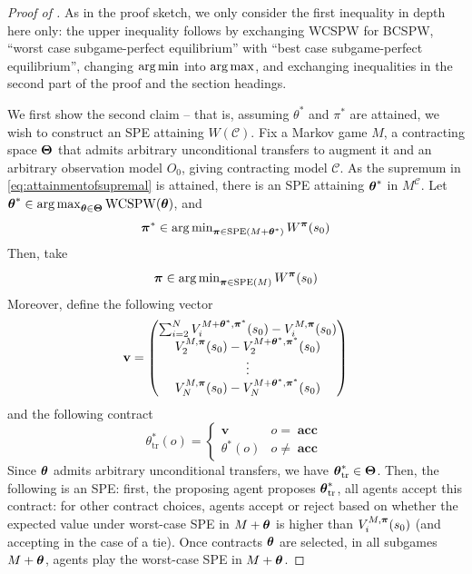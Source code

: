\begin{proof}[Proof of ]
As in the proof sketch, we only consider the first inequality in depth here only: the upper inequality follows by exchanging WCSPW for BCSPW, \enquote{worst case subgame-perfect equilibrium} with \enquote{best case subgame-perfect equilibrium}, changing $\operatorname{arg\,min}$ into $\operatorname{arg\,max}$, and exchanging inequalities in the second part of the proof and the section headings. 

We first show the second claim -- that is, assuming $\theta^*$ and $\pi^*$ are attained, we wish to construct an SPE attaining $W(\mathcal{C})$. Fix a Markov game $M$, a contracting space ${\boldsymbol{\Theta}}$ that admits arbitrary unconditional transfers to augment it and an arbitrary observation model $O_0$, giving contracting model $\mathcal{C}$. As the supremum in \eqref{eq:attainmentofsupremal} is attained, there is an SPE attaining ${\boldsymbol{\theta}}^*$ in $M^{\mathcal C}$. Let ${\boldsymbol{\theta}}^* \in \operatorname{arg\,max}_{{\boldsymbol{\theta}} \in {\boldsymbol{\Theta}}} \operatorname{WCSPW}({\boldsymbol{\theta}})$, and
\[
\boldsymbol{\pi}^* \in \operatorname{arg\,min}_{\boldsymbol{\pi} \in \operatorname{SPE}(M+{\boldsymbol{\theta}}^*)} W^{\boldsymbol{\pi}}(s_0)
\]
Then, take
\[
\boldsymbol{\pi} \in \operatorname{arg\,min}_{\boldsymbol{\pi} \in \operatorname{SPE}(M)} W^{\boldsymbol{\pi}}(s_0)
\]
Moreover, define the following vector
\[
\mathbf v = \begin{pmatrix}
    \sum_{i=2}^N V_i^{M+{\boldsymbol{\theta}}^*, \boldsymbol{\pi}^*}(s_0) - V_i^{M, \boldsymbol{\pi}}(s_0) \\
    V_2^{M, \boldsymbol{\pi}}(s_0) - V_2^{M+{\boldsymbol{\theta}}^*, \boldsymbol{\pi}^*}(s_0) \\
    \vdots \\
    V_N^{M, \boldsymbol{\pi}}(s_0) - V_N^{M+{\boldsymbol{\theta}}^*, \boldsymbol{\pi}^*}(s_0)
\end{pmatrix}
\]
and the following contract
\[
\theta^*_{\text{tr}}(o) = \begin{cases}
   \mathbf{v} & o = \mathbf{\operatorname{acc}}\\
   \theta^*(o) & o \neq\mathbf{\operatorname{acc}}
\end{cases}
\]
Since ${\boldsymbol{\theta}}$ admits arbitrary unconditional transfers, we have ${\boldsymbol{\theta}}^*_{\text{tr}} \in {\boldsymbol{\Theta}}$. Then, the following is an SPE: first, the proposing agent proposes ${\boldsymbol{\theta}}^*_{\text{tr}}$, all agents accept this contract: for other contract choices, agents accept or reject based on whether the expected value under worst-case SPE in $M+{\boldsymbol{\theta}}$ is higher than $V_i^{M, \boldsymbol{\pi}}(s_0)$ (and accepting in the case of a tie). Once contracts ${\boldsymbol{\theta}}$ are selected, in all subgames $M+{\boldsymbol{\theta}}$, agents play the worst-case SPE in $M+{\boldsymbol{\theta}}$. 
    

\end{proof}
